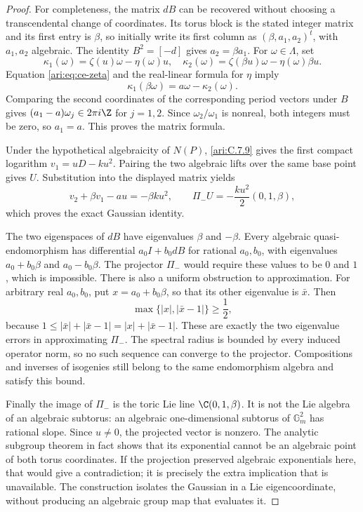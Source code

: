 \begin{proof}
For completeness, the matrix $dB$ can be recovered without
choosing a transcendental change of coordinates. Its torus
block is the stated integer matrix and its first entry is
$\beta$, so initially write its first column as
$(\beta,a_1,a_2)^t$, with $a_1,a_2$ algebraic.
The identity $B^2=[-d]$ gives $a_2=\beta a_1$.
For $\omega\in\Lambda$, set
\[
 \kappa_1(\omega)=\zeta(u)\omega-\eta(\omega)u,
 \quad
 \kappa_2(\omega)=\zeta(\beta u)\omega-\eta(\omega)\beta u.
\]
Equation \eqref{ari:eq:ce-zeta} and the real-linear formula for
$\eta$ imply
\[
 \kappa_1(\beta\omega)=a\omega-\kappa_2(\omega).
\]
Comparing the second coordinates of the corresponding period
vectors under $B$ gives
$(a_1-a)\omega_j\in2\pi i\Z$ for $j=1,2$.
Since $\omega_2/\omega_1$ is nonreal, both integers must
be zero, so $a_1=a$. This proves the matrix formula.

Under the hypothetical algebraicity of $N(P)$, \ref{ari:C.7.9} gives
the first compact logarithm $v_1=uD-ku^2$. Pairing the
two algebraic lifts over the same base point gives $U$.
Substitution into the displayed matrix yields
\[
 v_2+\beta v_1-au=-\beta ku^2,
 \qquad
 \Pi_-U=-\frac{ku^2}{2}(0,1,\beta),
\]
which proves the exact Gaussian identity.

The two eigenspaces of $dB$ have eigenvalues $\beta$ and
$-\beta$. Every algebraic quasi-endomorphism has differential
$a_0I+b_0dB$ for rational $a_0,b_0$, with eigenvalues
$a_0+b_0\beta$ and $a_0-b_0\beta$. The projector
$\Pi_-$ would require these values to be $0$ and $1$,
which is impossible. There is also a uniform obstruction to
approximation. For arbitrary real $a_0,b_0$, put
$x=a_0+b_0\beta$, so that its other eigenvalue is
$\bar x$. Then
\begin{equation}\label{ari:eq:ce-gap}
 \max\{|x|,|\bar x-1|\}\ge\frac12,
\end{equation}
because $1\le|\bar x|+|\bar x-1|=|x|+|\bar x-1|$.
These are exactly the two eigenvalue errors in approximating
$\Pi_-$. The spectral radius is bounded by every induced
operator norm, so no such sequence can converge to the
projector. Compositions and inverses of isogenies still belong
to the same endomorphism algebra and satisfy this bound.

Finally the image of $\Pi_-$ is the toric Lie line
$\C(0,1,\beta)$. It is not the Lie algebra of an algebraic
subtorus: an algebraic one-dimensional subtorus of
$\mathbb G_m^2$ has rational slope. Since $u\ne0$,
the projected vector is nonzero. The analytic subgroup
theorem in fact shows that its exponential cannot be an
algebraic point of both torus coordinates. If the projection
preserved algebraic exponentials here, that would give a
contradiction; it is precisely the extra implication that
is unavailable. The construction isolates the Gaussian in
a Lie eigencoordinate, without producing an algebraic
group map that evaluates it.
\end{proof}

